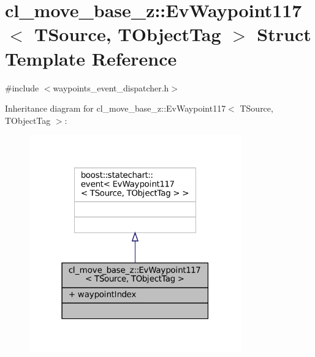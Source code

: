\hypertarget{structcl__move__base__z_1_1EvWaypoint117}{}\section{cl\+\_\+move\+\_\+base\+\_\+z\+:\+:Ev\+Waypoint117$<$ T\+Source, T\+Object\+Tag $>$ Struct Template Reference}
\label{structcl__move__base__z_1_1EvWaypoint117}


{\ttfamily \#include $<$waypoints\+\_\+event\+\_\+dispatcher.\+h$>$}



Inheritance diagram for cl\+\_\+move\+\_\+base\+\_\+z\+:\+:Ev\+Waypoint117$<$ T\+Source, T\+Object\+Tag $>$\+:
\nopagebreak
\begin{figure}[H]
\begin{center}
\leavevmode
\includegraphics[width=259pt]{structcl__move__base__z_1_1EvWaypoint117__inherit__graph}
\end{center}
\end{figure}


